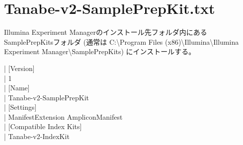\documentclass[titlepage,10pt,a4paper,uplatex]{jsbook}
\newenvironment{content}{\begin{shaded}\vspace{-1em}\raggedright\ttfamily\footnotesize\setlength{\baselineskip}{1.4em}}{\end{shaded}\vspace{-1em}}
\begin{document}
\section{Tanabe-v2-SamplePrepKit.txt}

Illumina Experiment Managerのインストール先フォルダ内にあるSamplePrepKitsフォルダ (通常は C:{\textbackslash}Program Files (x86){\textbackslash}Illumina{\textbackslash}Illumina Experiment Manager{\textbackslash}SamplePrepKits) にインストールする。

\begin{content}
| [Version]\\
| 1\\
| [Name]\\
| Tanabe-v2-SamplePrepKit\\
| [Settings]\\
| ManifestExtension	AmpliconManifest\\
| [Compatible Index Kits]\\
| Tanabe-v2-IndexKit
\end{content}
\end{document}
